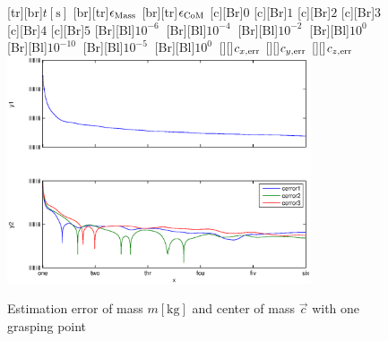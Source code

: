 \begin{figure}
	\centering	
	[tr][br]{$t\left[\mathrm{s}\right]$}
	[br][tr]{$\epsilon_{\mathrm{Mass}}$}
	[br][tr]{$\epsilon_{\mathrm{CoM}}$}
	[Br]{$0$}
	[Br]{$1$}
	[Br]{$2$}
	[Br]{$3$}
	[Br]{$4$}
	[Br]{$5$}
	[Br][Bl]{$10^{-6}\  $}
	[Br][Bl]{$10^{-4}\  $}
	[Br][Bl]{$10^{-2}\  $}
	[Br][Bl]{$10^0\  $}
	[Br][Bl]{$10^{-10}\  $}
	[Br][Bl]{$10^{-5}\  $}
	[Br][Bl]{$10^0\  $}
	[][]{\tiny $c_{x,\mathrm{err}}$}
	[][]{\tiny $c_{y,\mathrm{err}}$}
	[][]{\tiny $c_{z,\mathrm{err}}$}
	\includegraphics[width=0.8\textwidth]{figures/mass.eps}
	\vspace{0.2cm}
	\caption[Mass error]{Estimation error of mass $m \left[\mathrm{kg}\right]$ and center of mass $\vec{c}$ with one grasping point}
	\label{fig:estim_mass}
\end{figure}

